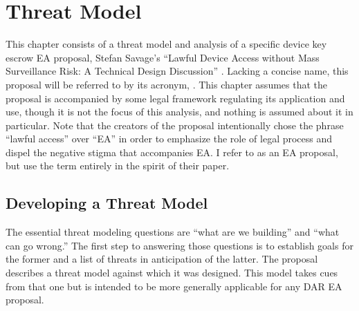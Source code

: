 \chapter{Threat Model}
\label{chap-threatmodel}

This chapter consists of a threat model and analysis of a specific device key escrow \ac{EA} proposal, Stefan Savage's
``Lawful Device Access without Mass Surveillance Risk: A Technical Design Discussion'' \cite{savage_lawful_2018}.
Lacking a concise name, this proposal will be referred to by its acronym, \ldawmsR. This chapter assumes that the
proposal is accompanied by some legal framework regulating its application and use, though it is not the focus of this
analysis, and nothing is assumed about it in particular. Note that the creators of the proposal intentionally chose the
phrase ``lawful access'' over ``\acl{EA}'' in order to emphasize the role of legal process and dispel the negative
stigma that accompanies \ac{EA}. I refer to \ldawmsr as an \ac{EA} proposal, but use the term entirely in the spirit of
their paper.




\section{Developing a Threat Model}

The essential threat modeling questions are ``what are we building'' and ``what can go wrong.'' The first step to
answering those questions is to establish goals for the former and a list of threats in anticipation of the latter. The
\ldawmsr proposal describes a threat model against which it was designed. This model takes cues from that one but is
intended to be more generally applicable for any \ac{DAR} \ac{EA} proposal.

\newcommand{\modelstart}[0]{\begin{itemize}}
\newcommand{\modelitem}[2]{ %
    \item \textbf{#1} \nopagebreak

    \vspace{0.5\baselineskip} \parbox{\linewidth}{#2} \vspace{0.5\baselineskip}
}
\newcommand{\modelend}{\end{itemize}}

